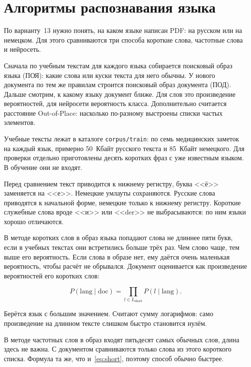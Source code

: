 \section{Алгоритмы распознавания языка}
\label{sec:algorithms}

По варианту~13 нужно понять, на каком языке написан PDF: на русском или на немецком. Для этого сравниваются три способа \mdash короткие слова, частотные слова и нейросеть.

Сначала по учебным текстам для каждого языка собирается поисковый образ языка (ПОЯ): какие слова или куски текста для него обычны. У нового документа по тем же правилам строится поисковый образ документа (ПОД). Дальше смотрим, к какому языку документ ближе. Для слов это произведение вероятностей, для нейросети \mdash вероятность класса. Дополнительно считается расстояние Out-of-Place: насколько по-разному выстроены списки частых элементов.

Учебные тексты лежат в каталоге \texttt{corpus/train}: по семь медицинских заметок на каждый язык, примерно 50~Кбайт русского текста и 85~Кбайт немецкого. Для проверки отдельно приготовлены десять коротких фраз с уже известным языком. В обучение они не входят.

Перед сравнением текст приводится к нижнему регистру, буква <<ё>> заменяется на <<е>>. Немецкие умлауты сохраняются. Русские слова приводятся к начальной форме, немецкие только к нижнему регистру. Короткие служебные слова вроде <<и>> или <<der>> не выбрасываются: по ним языки хорошо отличаются.

В методе коротких слов в образ языка попадают слова не длиннее пяти букв, если в учебных текстах они встретились больше трёх раз. Чем слово чаще, тем выше его вероятность. Если слова в образе нет, ему даётся очень маленькая вероятность, чтобы расчёт не обрывался. Документ оценивается как произведение вероятностей его коротких слов:

\begin{equation}
	P(\mathrm{lang}\mid\mathrm{doc}) = \prod_{l \in L_{\mathrm{short}}} P(l\mid\mathrm{lang}).
	\label{eq:short}
\end{equation}

Берётся язык с большим значением. Считают сумму логарифмов: само произведение на длинном тексте слишком быстро становится нулём.

В методе частотных слов в образ входят пятьдесят самых обычных слов, длина здесь не важна. С документом сравниваются только слова из этого короткого списка. Формула та же, что и~\eqref{eq:short}, поэтому способ обычно быстрее.

